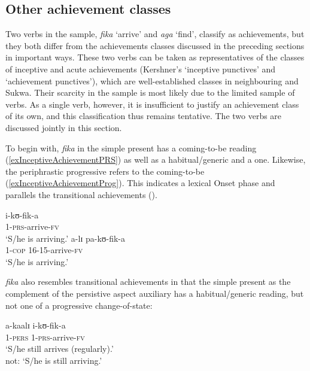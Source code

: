 \subsection{Other achievement classes}\label{VerbalClassOtherAchievements}
Two verbs in the sample, \textit{fika} \lq arrive' and \textit{aga} \lq find', classify as achievements, but they both differ from the achievements classes discussed in the preceding sections in important ways. These two verbs can be taken as representatives of the classes of inceptive and acute achievements (Kershner's \lq inceptive punctives' and \lq achievement punctives'), which are well-established classes in neighbouring  and Sukwa. Their scarcity in the sample is most likely due to the limited sample of verbs. As a single verb, however, it is insufficient to justify an achievement class of its own, and this classification thus remains tentative. The two verbs are discussed jointly in this section.

To begin with, \textit{fika} in the simple present has a coming-to-be reading (\ref{exInceptiveAchievementPRS}) as well as a habitual/generic and a  one. Likewise, the periphrastic progressive refers to the coming-to-be (\ref{exInceptiveAchievementProg}). This indicates a lexical Onset phase and parallels the transitional achievements ().

\begin{exe}
\begin{multicols}{2}
\ex \label{exInceptiveAchievementPRS}

\gll i-kʊ-fik-a\\
1-\textsc{prs}-arrive-\textsc{fv}\\
\glt \lq S/he is arriving.'
\columnbreak
\ex \label{exInceptiveAchievementProg}
\gll a-lɪ pa-kʊ-fik-a\\
1-\textsc{cop} 16-15-arrive-\textsc{fv}\\
\glt \lq S/he is arriving.'
\end{multicols}
\end{exe}

\textit{fika} also resembles transitional achievements in that the simple present as the complement of the persistive aspect auxiliary has a habitual/generic reading, but not one of a progressive change-of-state:

\begin{exe}
\ex \gll a-kaalɪ i-kʊ-fik-a\\
1-\textsc{pers} 1-\textsc{prs}-arrive-\textsc{fv}\\
\glt \lq S/he still arrives (regularly).'\\
not: \lq S/he is still arriving.'
\end{exe}

